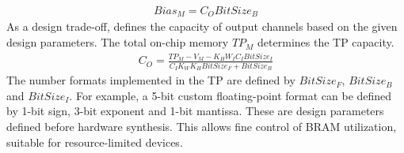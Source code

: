 \begin{eqnarray} \label{eq:bias_memory}
Bias_{M}=C_{O}BitSize_{B}
\end{eqnarray}
As a design trade-off,  defines the capacity of output channels based on the given design parameters. The total on-chip memory $TP_{M}$ determines the TP capacity.
\begin{eqnarray} \label{eq:channel_in_memory}
C_{O}=\frac{TP_{M}-V_{M}-K_{H}W_{I}C_{I}BitSize_{I}}{C_{I}K_{W}K_{H}BitSize_{F}+BitSize_{B}}
\end{eqnarray}
The number formats implemented in the TP are defined by $BitSize_F$, $BitSize_B$ and $BitSize_I$. For example, a 5-bit custom floating-point format can be defined by 1-bit sign, 3-bit exponent and 1-bit mantissa. These are design parameters defined before hardware synthesis. This allows fine control of BRAM utilization, suitable for resource-limited devices.

